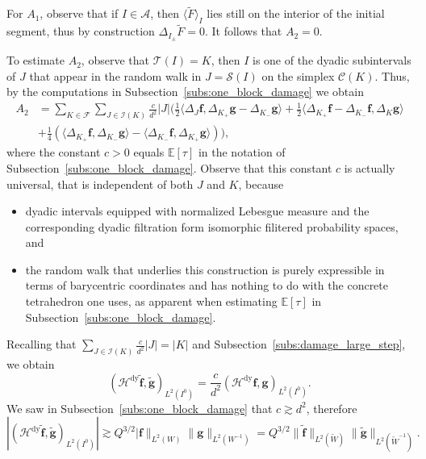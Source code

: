 \documentclass{amsart}
\newcommand{\wt}{\widetilde}
\theoremstyle{definition}
\theoremstyle{remark}
\begin{document}
For $A_1$, observe that if $I\in\mathscr{A}$, then $\langle\wt{F}\rangle_{I}$ lies still on the interior of the initial segment, thus by construction $\Delta_{I_{\pm}}\wt{F}=0$. It follows that $A_2=0$.

To estimate $A_2$, observe that $\mathscr{T}(I)=K$, then $I$ is one of the dyadic subintervals of $J$ that appear in the random walk in $J=\mathscr{S}(I)$ on the simplex $\mathscr{C}(K)$. Thus, by the computations in Subsection~\ref{subs:one_block_damage} we obtain
\begin{align*}
    A_2&=\sum_{K\in\mathscr{F}}\sum_{J\in\mathscr{I}(K)}\frac{c}{d^2}|J|\bigg(\frac{1}{2}\langle\Delta_{J}\mathbf{f},\Delta_{K_{+}}\mathbf{g}-\Delta_{K_{-}}\mathbf{g}\rangle
    +\frac{1}{2}\langle\Delta_{K_{+}}\mathbf{f}-\Delta_{K_{-}}\mathbf{f},\Delta_{K}\mathbf{g}\rangle\\
    &+\frac{1}{4}(\langle\Delta_{K_{+}}\mathbf{f},\Delta_{K_{-}}\mathbf{g}\rangle-\langle\Delta_{K_{-}}\mathbf{f},\Delta_{K_{+}}\mathbf{g}\rangle)\bigg),
\end{align*}
where the constant $c>0$ equals $\mathbb{E}[\tau]$ in the notation of Subsection~\ref{subs:one_block_damage}. Observe that this constant $c$ is actually universal, that is independent of both $J$ and $K$, because
\begin{itemize}
    \item dyadic intervals equipped with normalized Lebesgue measure and the corresponding dyadic filtration form isomorphic filitered probability spaces, and

    \item the random walk that underlies this construction is purely expressible in terms of barycentric coordinates and has nothing to do with the concrete tetrahedron one uses, as apparent when estimating $\mathbb{E}[\tau]$ in Subsection~\ref{subs:one_block_damage}.
\end{itemize}
Recalling that $\sum_{J\in\mathscr{I}(K)}\frac{c}{d^2}|J|=|K|$ and Subsection~\ref{subs:damage_large_step}, we obtain
\begin{equation*}
    (\mathcal{H}^{\text{dy}}\wt{\mathbf{f}},\wt{\mathbf{g}})_{L^2(I^0)}=\frac{c}{d^2}(\mathcal{H}^{\text{dy}}\mathbf{f},\mathbf{g})_{L^2(I^0)}.
\end{equation*}
We saw in Subsection~\ref{subs:one_block_damage} that $c\gtrsim d^2$, therefore
\begin{equation*}
    |(\mathcal{H}^{\text{dy}}\wt{\mathbf{f}},\wt{\mathbf{g}})_{L^2(I^0)}|\gtrsim Q^{3/2}|\mathbf{f}\|_{L^2(W)}\|\mathbf{g}\|_{L^2(W^{-1})}
    =Q^{3/2}\|\wt{\mathbf{f}}\|_{L^2(\wt{W})}\|\wt{\mathbf{g}}\|_{L^2(\wt{W}^{-1})}.
\end{equation*}
\end{document}
